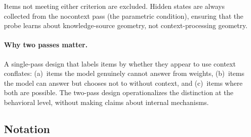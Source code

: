 \documentclass[11pt]{article}
\begin{document}
Items not meeting either criterion are excluded. Hidden states are always collected from
the nocontext pass (the parametric condition), ensuring that the probe learns about
knowledge-source geometry, not context-processing geometry.

\paragraph{Why two passes matter.}
A single-pass design that labels items by whether they appear to use context conflates:
(a)~items the model genuinely cannot answer from weights, (b)~items the model can answer
but chooses not to without context, and (c)~items where both are possible. The two-pass
design operationalizes the distinction at the behavioral level, without making claims
about internal mechanisms.

\subsection{Notation}
\label{sec:notation}
\end{document}
